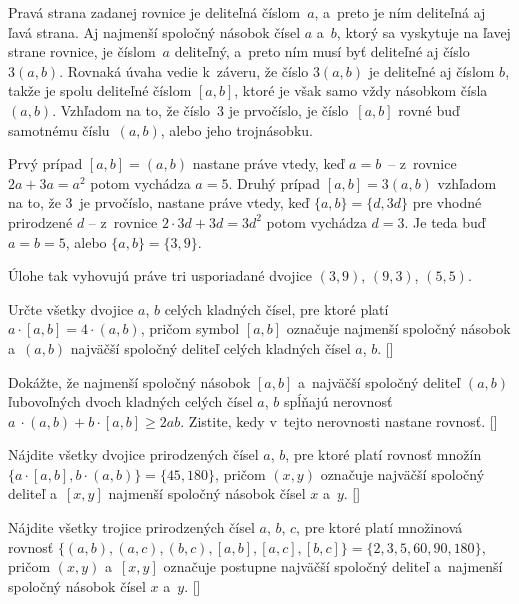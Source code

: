 {\ineres
Pravá strana zadanej rovnice je deliteľná
číslom~$a$, a~preto je ním deliteľná aj ľavá strana. Aj najmenší
spoločný násobok čísel $a$ a~$b$, ktorý sa vyskytuje na ľavej strane rovnice,
je číslom~$a$ deliteľný, a~preto ním musí byť deliteľné aj číslo $3(a, b)$.
Rovnaká úvaha vedie k~záveru, že číslo $3(a,b)$ je deliteľné aj číslom $b$,
takže je spolu deliteľné číslom $[a,b]$, ktoré je však samo vždy násobkom
čísla~$(a,b)$. Vzhľadom na to, že číslo~3 je prvočíslo, je číslo~$[a,b]$
rovné buď samotnému číslu~$(a,b)$, alebo jeho trojnásobku.

Prvý prípad $[a,b]=(a,b)$ nastane práve vtedy, keď $a=b$~-- z~rovnice $2a+3a=a^2$
potom vychádza $a=5$. Druhý prípad $[a,b]=3(a,b)$ vzhľadom na to, že 3~je prvočíslo,
nastane práve vtedy, keď $\{a,b\}=\{d,3d\}$ pre vhodné prirodzené $d$ -- z~rovnice
$2\cdot3d+3d=3d^2$ potom vychádza $d=3$. Je teda buď $a=b=5$, alebo
$\{a,b\}=\{3,9\}$.

Úlohe tak vyhovujú práve tri usporiadané dvojice $(3, 9)$, $(9, 3)$, $(5, 5)$.


Určte všetky dvojice $a$, $b$ celých kladných čísel, pre ktoré platí
$a\cdot [a,b]=4\cdot (a,b)$,
pričom symbol $[a,b]$ označuje najmenší spoločný násobok a~$(a,b)$
najväčší spoločný deliteľ celých kladných čísel $a$, $b$.
[]

Dokážte, že najmenší spoločný násobok $[a, b]$ a~najväčší spoločný deliteľ $(a, b)$ ľubovoľných
dvoch kladných celých čísel $a$, $b$ spĺňajú nerovnosť
$a~\cdot (a, b) + b \cdot [a, b] \ge 2ab$.
Zistite, kedy v~tejto nerovnosti nastane rovnosť. []

\D
Nájdite všetky dvojice prirodzených čísel $a$, $b$, pre ktoré platí
rovnosť množín
$\{a\cdot[a,b],\allowbreak b\cdot(a,b)\}=\{45,180\}$,
pričom $(x,y)$ označuje najväčší spoločný deliteľ a~$[x,y]$ najmenší spoločný násobok čísel $x$ a~$y$. []

Nájdite všetky trojice prirodzených čísel $a$, $b$, $c$, pre ktoré platí
množinová rovnosť
$\bigl\{(a,b),(a,c),(b,c),[a,b],[a,c],[b,c]\bigr\}=
\{2,3,5,60,90,180\}$,
pričom $(x,y)$ a~$[x,y]$ označuje postupne najväčší spoločný deliteľ
a~najmenší spoločný násobok čísel $x$ a~$y$. []
}

